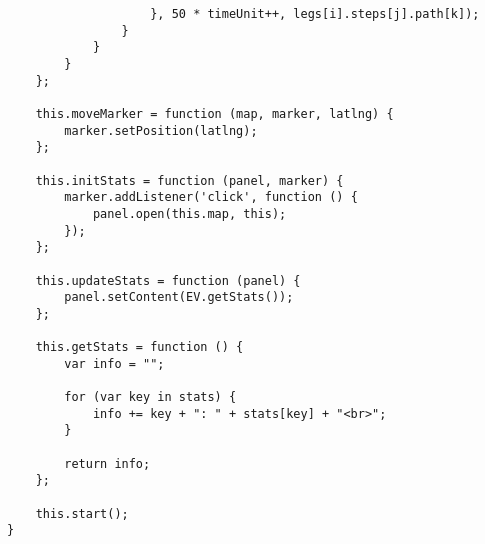 \begin{verbatim}
                    }, 50 * timeUnit++, legs[i].steps[j].path[k]);
                }
            }
        }
    };

    this.moveMarker = function (map, marker, latlng) {
        marker.setPosition(latlng);
    };

    this.initStats = function (panel, marker) {
        marker.addListener('click', function () {
            panel.open(this.map, this);
        });
    };

    this.updateStats = function (panel) {
        panel.setContent(EV.getStats());
    };

    this.getStats = function () {
        var info = "";

        for (var key in stats) {
            info += key + ": " + stats[key] + "<br>";
        }

        return info;
    };

    this.start();
}
\end{verbatim}






